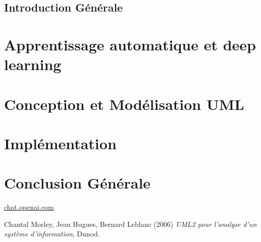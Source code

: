 \documentclass[12pt]{book}
\begin{document}

\tableofcontents
\listoffigures
\newpage
\section{Introduction Générale}
\chapter{Apprentissage automatique et deep learning}
\chapter{Conception et Modélisation UML}
\chapter{Implémentation}
\chapter{Conclusion Générale}
\begin{thebibliography}{9}
    \href{https://chat.openai.com}{chat.openai.com}
    
    Chantal Morley, Jean Hugues, Bernard Leblanc (2006) \emph{UML2 pour l’analyse d’un système d’information}, Dunod.
\end{thebibliography}
    
\end{document}
